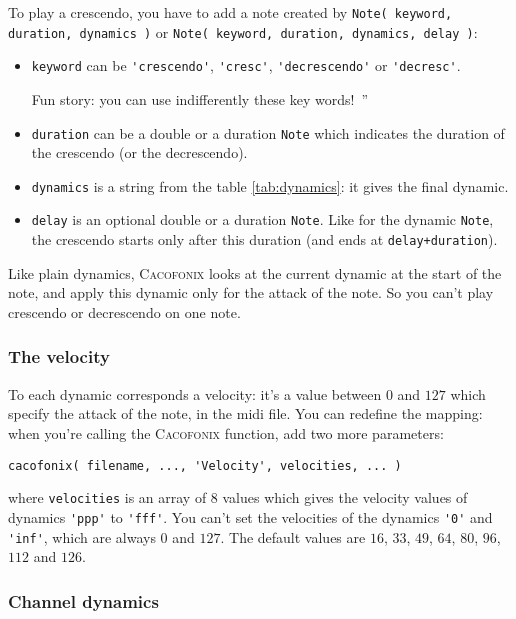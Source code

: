\documentclass{article}
\newcommand{\cacofonix}{\textsc{Cacofonix}\xspace}
\newcommand{\note}{\lstinline!Note!\xspace}
\newenvironment{meenv}{ \par \noindent \makebox[6em][r]{ \textcolor{mecolor}{Me}: `` --~}}{~''}
\newcommand{\me}[1]{\begin{meenv}#1\end{meenv}}
\begin{document}
To play a crescendo, you have to add a note created by \lstinline!Note( keyword, duration, dynamics )! or \lstinline!Note( keyword, duration, dynamics, delay )!:
\begin{itemize}
	\item \lstinline!keyword! can be \lstinline!'crescendo'!, \lstinline!'cresc'!, \lstinline!'decrescendo'! or \lstinline!'decresc'!.
		\me{Fun story: you can use indifferently these key words!}
	\item \lstinline!duration! can be a double or a duration \note which indicates the duration of the crescendo (or the decrescendo).
	\item \lstinline!dynamics! is a string from the table \ref{tab:dynamics}: it gives the final dynamic.
	\item \lstinline!delay! is an optional double or a duration \note. Like for the dynamic \note, the crescendo starts only after this duration (and ends at \lstinline!delay+duration!).
\end{itemize}

Like plain dynamics, \cacofonix looks at the current dynamic at the start of the note, and apply this dynamic only for the attack of the note. So you can't play crescendo or decrescendo on one note.

\subsubsection{The velocity}
\label{sec:Velocity}

To each dynamic corresponds a velocity: it's a value between $0$ and $127$ which specify the attack of the note, in the midi file. You can redefine the mapping: when you're calling the \cacofonix function, add two more parameters:
\begin{lstlisting}
cacofonix( filename, ..., 'Velocity', velocities, ... )
\end{lstlisting}
where \lstinline!velocities! is an array of $8$ values which gives the velocity values of dynamics \lstinline!'ppp'! to \lstinline!'fff'!. You can't set the velocities of the dynamics \lstinline!'0'! and \lstinline!'inf'!, which are always $0$ and $127$. The default values are $16$, $33$, $49$, $64$, $80$, $96$, $112$ and $126$.

\subsubsection{Channel dynamics}
\label{sec:ChannelDynamics}
\end{document}

